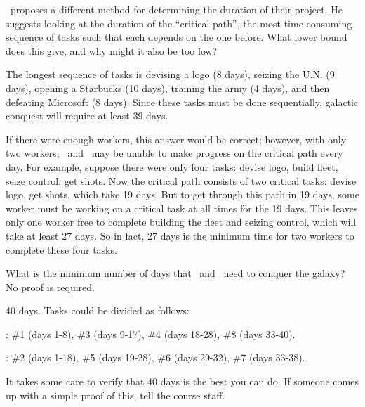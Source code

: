 \begin{problem}
\ppart \Jay\  proposes a different method for determining the
duration of their project.  He suggests looking at the duration of
the ``critical path'', the most time-consuming sequence of tasks
such that each depends on the one before.  What lower bound does this
give, and why might it also be too low?

\begin{solution}
The longest sequence of tasks is devising a logo (8 days),
seizing the U.N. (9 days), opening a Starbucks (10 days), training
the army (4 days), and then defeating Microsoft (8 days).  Since these
tasks must be done sequentially, galactic conquest will require at
least 39 days.

If there were enough workers, this answer would be correct; however, with
only two workers, \Jay\  and \Rongrong\  may be unable to make progress on the
critical path every day.  For example, suppose there were only four
tasks: devise logo, build fleet, seize control, get shots.  Now the
critical path consists of two critical tasks: devise logo, get shots,
which take 19 days.  But to get through this path in 19 days, some worker
must be working on a critical task at all times for the 19 days.  This
leaves only one worker free to complete building the fleet and seizing
control, which will take at least 27 days.  So in fact, 27 days is the
minimum time for two workers to complete these four tasks.
\end{solution}

\ppart What is the minimum number of days that \Jay\  and \Rongrong\ 
need to conquer the galaxy?  No proof is required.

\begin{solution}
40 days.  Tasks could be divided as follows:

\Rongrong: \#1 (days 1-8), \#3 (days 9-17), \#4 (days 18-28), \#8 (days
33-40).

\Jay: \#2 (days 1-18), \#5 (days 19-28), \#6 (days 29-32), \#7 (days
33-38).  

It takes some care to verify that 40 days is the best you can do.  If
someone comes up with a simple proof of this, tell the course staff.

\end{solution}
\eparts
\end{problem} 


\endinput
